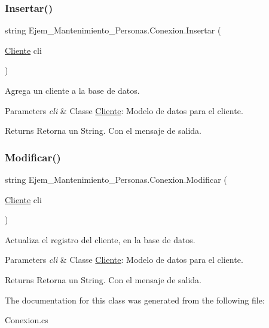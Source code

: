\subsubsection{\texorpdfstring{Insertar()}{Insertar()}}
{\footnotesize\ttfamily string Ejem\+\_\+\+Mantenimiento\+\_\+\+Personas.\+Conexion.\+Insertar (\begin{DoxyParamCaption}\item[{\mbox{\hyperlink{class_ejem___mantenimiento___personas_1_1_cliente}{Cliente}}}]{cli }\end{DoxyParamCaption})}



Agrega un cliente a la base de datos. 


\begin{DoxyParams}{Parameters}
{\em cli} & Classe \mbox{\hyperlink{class_ejem___mantenimiento___personas_1_1_cliente}{Cliente}}\+: Modelo de datos para el cliente.\\
\hline
\end{DoxyParams}
\begin{DoxyReturn}{Returns}
Retorna un String. Con el mensaje de salida.
\end{DoxyReturn}
\mbox{\label{class_ejem___mantenimiento___personas_1_1_conexion_a1fc3cac8eff1c8f2f7197b56e7209df6}} 
\subsubsection{\texorpdfstring{Modificar()}{Modificar()}}
{\footnotesize\ttfamily string Ejem\+\_\+\+Mantenimiento\+\_\+\+Personas.\+Conexion.\+Modificar (\begin{DoxyParamCaption}\item[{\mbox{\hyperlink{class_ejem___mantenimiento___personas_1_1_cliente}{Cliente}}}]{cli }\end{DoxyParamCaption})}



Actualiza el registro del cliente, en la base de datos. 


\begin{DoxyParams}{Parameters}
{\em cli} & Classe \mbox{\hyperlink{class_ejem___mantenimiento___personas_1_1_cliente}{Cliente}}\+: Modelo de datos para el cliente.\\
\hline
\end{DoxyParams}
\begin{DoxyReturn}{Returns}
Retorna un String. Con el mensaje de salida.
\end{DoxyReturn}


The documentation for this class was generated from the following file\+:\begin{DoxyCompactItemize}
\item 
Conexion.\+cs\end{DoxyCompactItemize}
